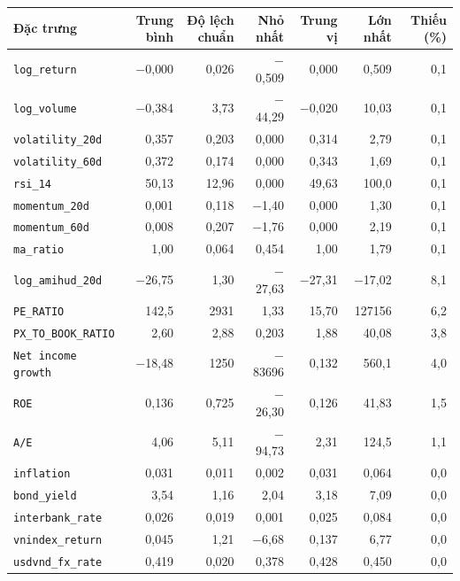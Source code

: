 \begin{tabular}{@{}lrrrrrr@{}}
\toprule
Đặc trưng & Trung bình & Độ lệch chuẩn & Nhỏ nhất & Trung vị & Lớn nhất & Thiếu (\%) \\
\midrule
\texttt{log\_return} & $-$0{,}000 & 0{,}026 & $-$0{,}509 & 0{,}000 & 0{,}509 & 0{,}1 \\
\texttt{log\_volume} & $-$0{,}384 & 3{,}73 & $-$44{,}29 & $-$0{,}020 & 10{,}03 & 0{,}1 \\
\texttt{volatility\_20d} & 0{,}357 & 0{,}203 & 0{,}000 & 0{,}314 & 2{,}79 & 0{,}1 \\
\texttt{volatility\_60d} & 0{,}372 & 0{,}174 & 0{,}000 & 0{,}343 & 1{,}69 & 0{,}1 \\
\texttt{rsi\_14} & 50{,}13 & 12{,}96 & 0{,}000 & 49{,}63 & 100{,}0 & 0{,}1 \\
\texttt{momentum\_20d} & 0{,}001 & 0{,}118 & $-$1{,}40 & 0{,}000 & 1{,}30 & 0{,}1 \\
\texttt{momentum\_60d} & 0{,}008 & 0{,}207 & $-$1{,}76 & 0{,}000 & 2{,}19 & 0{,}1 \\
\texttt{ma\_ratio} & 1{,}00 & 0{,}064 & 0{,}454 & 1{,}00 & 1{,}79 & 0{,}1 \\
\texttt{log\_amihud\_20d} & $-$26{,}75 & 1{,}30 & $-$27{,}63 & $-$27{,}31 & $-$17{,}02 & 8{,}1 \\
\texttt{PE\_RATIO} & 142{,}5 & 2931 & 1{,}33 & 15{,}70 & 127156 & 6{,}2 \\
\texttt{PX\_TO\_BOOK\_RATIO} & 2{,}60 & 2{,}88 & 0{,}203 & 1{,}88 & 40{,}08 & 3{,}8 \\
\texttt{Net income growth} & $-$18{,}48 & 1250 & $-$83696 & 0{,}132 & 560{,}1 & 4{,}0 \\
\texttt{ROE} & 0{,}136 & 0{,}725 & $-$26{,}30 & 0{,}126 & 41{,}83 & 1{,}5 \\
\texttt{A/E} & 4{,}06 & 5{,}11 & $-$94{,}73 & 2{,}31 & 124{,}5 & 1{,}1 \\
\texttt{inflation} & 0{,}031 & 0{,}011 & 0{,}002 & 0{,}031 & 0{,}064 & 0{,}0 \\
\texttt{bond\_yield} & 3{,}54 & 1{,}16 & 2{,}04 & 3{,}18 & 7{,}09 & 0{,}0 \\
\texttt{interbank\_rate} & 0{,}026 & 0{,}019 & 0{,}001 & 0{,}025 & 0{,}084 & 0{,}0 \\
\texttt{vnindex\_return} & 0{,}045 & 1{,}21 & $-$6{,}68 & 0{,}137 & 6{,}77 & 0{,}0 \\
\texttt{usdvnd\_fx\_rate} & 0{,}419 & 0{,}020 & 0{,}378 & 0{,}428 & 0{,}450 & 0{,}0 \\
\bottomrule
\end{tabular}
